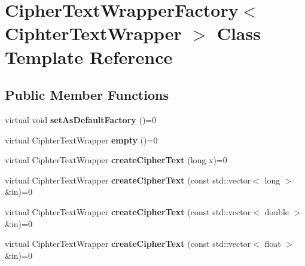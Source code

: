 \hypertarget{classCipherTextWrapperFactory}{}\section{Cipher\+Text\+Wrapper\+Factory$<$ Ciphter\+Text\+Wrapper $>$ Class Template Reference}
\label{classCipherTextWrapperFactory}
\subsection*{Public Member Functions}
\begin{DoxyCompactItemize}
\item 
\mbox{\label{classCipherTextWrapperFactory_a4fa945beadaaecaa9746b081cbef555c}} 
virtual void {\bfseries set\+As\+Default\+Factory} ()=0
\item 
\mbox{\label{classCipherTextWrapperFactory_a74fad1164162787aa98a3d9a7c6351f3}} 
virtual Ciphter\+Text\+Wrapper {\bfseries empty} ()=0
\item 
\mbox{\label{classCipherTextWrapperFactory_a742c06d87256c4af89727216f732ca03}} 
virtual Ciphter\+Text\+Wrapper {\bfseries create\+Cipher\+Text} (long x)=0
\item 
\mbox{\label{classCipherTextWrapperFactory_afbae84b62a32db852e241c29a7b7589a}} 
virtual Ciphter\+Text\+Wrapper {\bfseries create\+Cipher\+Text} (const std\+::vector$<$ long $>$ \&in)=0
\item 
\mbox{\label{classCipherTextWrapperFactory_a0781f478d2efdcd4f73b5f642f3b64a3}} 
virtual Ciphter\+Text\+Wrapper {\bfseries create\+Cipher\+Text} (const std\+::vector$<$ double $>$ \&in)=0
\item 
\mbox{\label{classCipherTextWrapperFactory_a2bf5d024b47dbf24cd6da69de4490169}} 
virtual Ciphter\+Text\+Wrapper {\bfseries create\+Cipher\+Text} (const std\+::vector$<$ float $>$ \&in)=0
\item 
\mbox{\label{classCipherTextWrapperFactory_a450db5b8bf0461a3587da2f058bd38da}} 

\end{DoxyCompactItemize}

